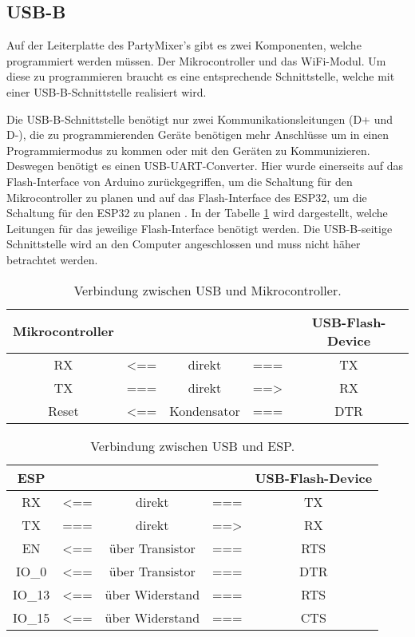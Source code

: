 \subsection{USB-B}
\label{subsec:USB-B}

Auf der Leiterplatte des PartyMixer's gibt es zwei Komponenten, welche programmiert werden müssen. Der Mikrocontroller und das WiFi-Modul. Um diese zu programmieren braucht es eine entsprechende Schnittstelle, welche mit einer USB-B-Schnittstelle realisiert wird.

Die USB-B-Schnittstelle benötigt nur zwei Kommunikationsleitungen (D+ und D-), die zu programmierenden Geräte benötigen mehr Anschlüsse um in einen Programmiermodus zu kommen oder mit den Geräten zu Kommunizieren. Deswegen benötigt es einen USB-UART-Converter. Hier wurde einerseits auf das Flash-Interface von Arduino zurückgegriffen, um die Schaltung für den Mikrocontroller zu planen \cite{arduino_cc_arduino_2017} und auf das Flash-Interface des ESP32, um die Schaltung für den ESP32 zu planen \cite{espressif_systems_esp32_2016}. In der Tabelle \ref{tab:USB_uC} wird dargestellt, welche Leitungen für das jeweilige Flash-Interface benötigt werden. Die USB-B-seitige Schnittstelle wird an den Computer angeschlossen und muss nicht häher betrachtet werden.

\begin{table}[h!]
\center
\begin{tabular}{|c|lcl|c|}
\hline
\textbf{Mikrocontroller} & & & & \textbf{USB-Flash-Device} \\ \hline
RX & <== & direkt & === & TX  \\
TX & === & direkt & ==> & RX  \\
Reset & <== & Kondensator & === & DTR \\
\hline
\end{tabular}
\label{tab:USB_uC}
\caption{Verbindung zwischen USB und Mikrocontroller.}
\end{table}

\begin{table}[h!]
\center
\begin{tabular}{|c|lcl|c|}
\hline
\textbf{ESP} & & & & \textbf{USB-Flash-Device} \\ \hline
RX & <== & direkt & === & TX  \\
TX & === & direkt & ==> & RX  \\
EN & <== & über Transistor & === & RTS \\
IO\_0 & <== & über Transistor & === & DTR \\
IO\_13 & <== & über Widerstand & === & RTS \\
IO\_15 & <== & über Widerstand & === & CTS \\
\hline
\end{tabular}
\label{tab:USB_ESP}
\caption{Verbindung zwischen USB und ESP.}
\end{table}

